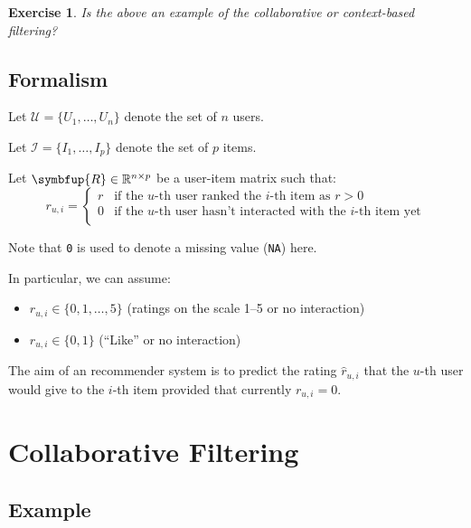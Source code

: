 \documentclass[10pt,b5paper,krantz1]{krantz}
\providecommand{\tightlist}{%
  \setlength{\itemsep}{0pt}\setlength{\parskip}{0pt}}
\newtheorem{exercise}{Exercise}[chapter]
\renewcommand{\mathbf}[1]{\symbfup{#1}}
\begin{document}
\begin{exercise}

Is the above an example of the collaborative or context-based filtering?

\end{exercise}

\hypertarget{formalism-2}{%
\subsection{Formalism}\label{formalism-2}}

Let \(\mathcal{U}=\{ U_1,\dots,U_n \}\) denote the set of \(n\) users.

Let \(\mathcal{I}=\{ I_1,\dots,I_p \}\) denote the set of \(p\) items.

Let \(\mathbf{R}\in\mathbb{R}^{n\times p}\) be a user-item matrix such that:
\[
r_{u,i}=\left\{
\begin{array}{ll}
r & \text{if the $u$-th user ranked the $i$-th item as $r>0$}\\
0 & \text{if the $u$-th user hasn't interacted with the $i$-th item yet}\\
\end{array}
\right.
\]

\begin{description}
\tightlist
\item[Remark.]
Note that \texttt{0} is used to denote a missing value (\texttt{NA}) here.
\end{description}

In particular, we can assume:

\begin{itemize}
\tightlist
\item
  \(r_{u,i}\in\{0,1,\dots,5\}\) (ratings on the scale 1--5 or no interaction)
\item
  \(r_{u,i}\in\{0,1\}\) (``Like'' or no interaction)
\end{itemize}

The aim of an recommender system is to predict the rating \(\hat{r}_{u,i}\)
that the \(u\)-th user would give to the \(i\)-th item provided that currently
\(r_{u,i}=0\).

\hypertarget{collaborative-filtering}{%
\section{Collaborative Filtering}\label{collaborative-filtering}}

\hypertarget{example}{%
\subsection{Example}\label{example}}
\end{document}
